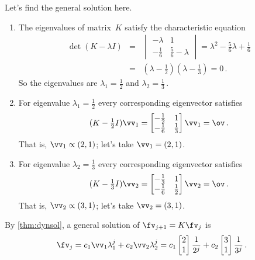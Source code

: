 \begin{reduce}
\begin{example}
\begin{solution}
\begin{enumerate}[ref=\ref{eg:2expfit}(\alph*)]
Let's find the general solution here.
\begin{enumerate}
\item The eigenvalues of matrix~\(K\) satisfy the characteristic equation
\begin{eqnarray*}
\det(K-\lambda I)&=&\begin{vmatrix} -\lambda&1\\-\frac16& \frac56-\lambda\end{vmatrix}
=\lambda^2-\tfrac56\lambda+\tfrac16
\\&
=&(\lambda-\tfrac12)(\lambda-\tfrac13)
=0\,.
\end{eqnarray*}
So the eigenvalues are \(\lambda_1=\tfrac12\) and \(\lambda_2=\tfrac13\)\,.
\item For eigenvalue \(\lambda_1=\tfrac12\) every corresponding eigenvector satisfies
\begin{equation*}
(K-\tfrac12I)\vv_1=\begin{bmatrix} -\frac12&1\\-\frac16&\frac13 \end{bmatrix}\vv_1=\ov\,.
\end{equation*}
That is, \(\vv_1\propto (2,1)\); let's take \(\vv_1=(2,1)\).
\item For eigenvalue \(\lambda_2=\tfrac13\) every corresponding eigenvector satisfies
\begin{equation*}
(K-\tfrac13I)\vv_2=\begin{bmatrix} -\frac13&1\\-\frac16&\frac12 \end{bmatrix}\vv_2=\ov\,.
\end{equation*}
That is, \(\vv_2\propto (3,1)\); let's take \(\vv_2=(3,1)\).
\end{enumerate}
By \autoref{thm:dynsol}, a general solution of \(\fv_{j+1}=K\fv_j\) is 
\begin{equation*}
\fv_j=c_1\vv_1\lambda_1^j+c_2\vv_2\lambda_2^j
=c_1\begin{bmatrix} 2\\1 \end{bmatrix}\frac1{2^j} +c_2\begin{bmatrix} 3\\1 \end{bmatrix}\frac1{3^j}\,.
\end{equation*}



\end{enumerate}
\end{solution}
\end{example}
\end{reduce}
